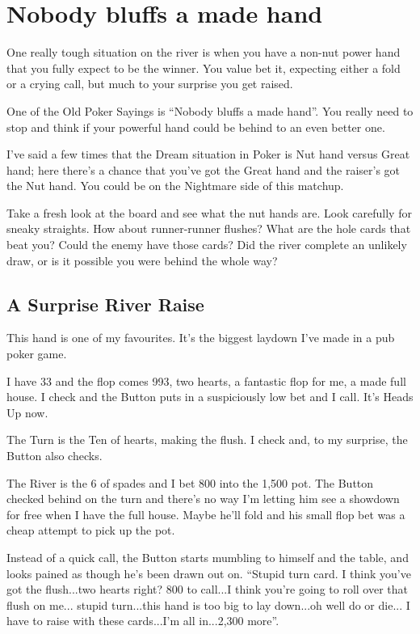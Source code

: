 \chapter{Nobody bluffs a made hand}


One really tough situation on the river is when you have a
non-nut power hand that you fully expect to be the winner.
You value bet it, expecting either a fold or a crying call,
but much to your surprise you get raised.

One of the Old Poker Sayings is ``Nobody bluffs a made hand''.
You really need to stop and think if your powerful hand could
be behind to an even better one.

I've said a few times that the Dream situation in
Poker is Nut hand versus Great hand; here there's a chance
that you've got the Great hand and the raiser's got the Nut hand.
You could be on the Nightmare side of this matchup.

Take a fresh look at the board and see what the nut hands are.
Look carefully for sneaky straights. How about runner-runner flushes?
What are the hole cards that beat you? Could the enemy
have those cards? Did the river complete an unlikely draw, or is it
possible you were behind the whole way?

\section{A Surprise River Raise}

This hand is one of my favourites. It's the biggest
laydown I've made in a pub poker game.

I have 33 and the flop comes 993, two hearts, a fantastic
flop for me, a made full house. I check and the Button puts in a
suspiciously low bet and I call. It's Heads Up now.

The Turn is the Ten of hearts, making the flush. I check and, to my
surprise, the Button also checks.

The River is the 6 of spades and I bet 800 into the 1,500 pot. The Button
checked behind on the turn and there's no way I'm letting him
see a showdown for free when I have the full house. Maybe he'll fold
and his small flop bet was a cheap attempt to pick up the pot.

Instead of a quick call, the Button starts mumbling to himself and the
table, and looks pained as though he's been drawn out on.
``Stupid turn card. I think you've got the flush...two hearts right?
800 to call...I think you're going to roll over that flush on me...
stupid turn...this hand is too big to lay down...oh well do or die...
I have to raise with these cards...I'm all in...2,300 more''.

